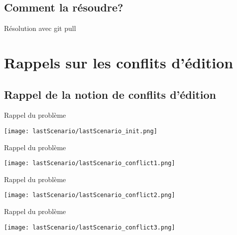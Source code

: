 \documentclass{beamer}
\begin{document}
\subsection{Comment la résoudre?}
\begin{frame}{Résolution avec git pull}
\end{frame}





\section{Rappels sur les conflits d'édition}

\subsection{Rappel de la notion de conflits d'édition}
\begin{frame}{Rappel du problème}
\begin{center}
    \texttt{[image: lastScenario/lastScenario\_init.png]}
\end{center}
\end{frame}

\begin{frame}{Rappel du problème}
\begin{center}
    \texttt{[image: lastScenario/lastScenario\_conflict1.png]}
\end{center}
\end{frame}

\begin{frame}{Rappel du problème}
\begin{center}
    \texttt{[image: lastScenario/lastScenario\_conflict2.png]}
\end{center}
\end{frame}

\begin{frame}{Rappel du problème}
\begin{center}
    \texttt{[image: lastScenario/lastScenario\_conflict3.png]}
\end{center}
\end{frame}
\end{document}
